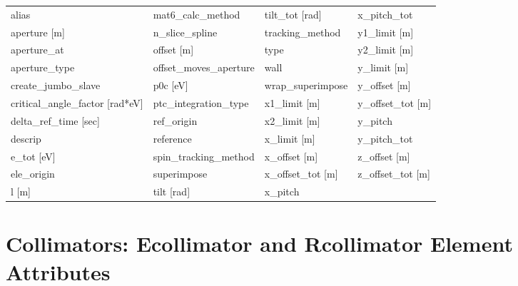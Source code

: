  \begin{tabular}{llll} \toprule
alias                            & mat6_calc_method                 & tilt_tot [rad]                   & x_pitch_tot                      \\
aperture [m]                     & n_slice_spline                   & tracking_method                  & y1_limit [m]                     \\
aperture_at                      & offset [m]                       & type                             & y2_limit [m]                     \\
aperture_type                    & offset_moves_aperture            & wall                             & y_limit [m]                      \\
create_jumbo_slave               & p0c [eV]                         & wrap_superimpose                 & y_offset [m]                     \\
critical_angle_factor [rad*eV]   & ptc_integration_type             & x1_limit [m]                     & y_offset_tot [m]                 \\
delta_ref_time [sec]             & ref_origin                       & x2_limit [m]                     & y_pitch                          \\
descrip                          & reference                        & x_limit [m]                      & y_pitch_tot                      \\
e_tot [eV]                       & spin_tracking_method             & x_offset [m]                     & z_offset [m]                     \\
ele_origin                       & superimpose                      & x_offset_tot [m]                 & z_offset_tot [m]                 \\
l [m]                            & tilt [rad]                       & x_pitch                          &                                  \\
 \bottomrule
 \end{tabular}
 \vfill
 
 \section{Collimators: Ecollimator and Rcollimator Element Attributes}
 \label{s:list.collimator}
 
